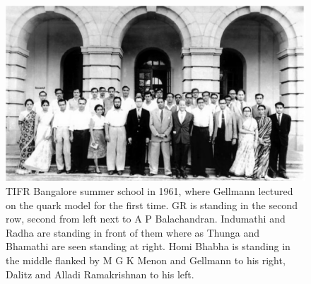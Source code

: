 \begin{figure}[H]
\centering
\includegraphics[scale=0.35]{src/images/chap25/6.eps}
\caption{TIFR Bangalore summer school in 1961, where Gellmann lectured on the
quark model for the first time. GR is standing in the second row, second from left
next to A P Balachandran. Indumathi and Radha are standing in front of them where
as Thunga and Bhamathi are seen standing at right. Homi Bhabha is standing in
the middle flanked by M G K Menon and Gellmann to his right, Dalitz and Alladi\break
Ramakrishnan to his left.}
\end{figure}


